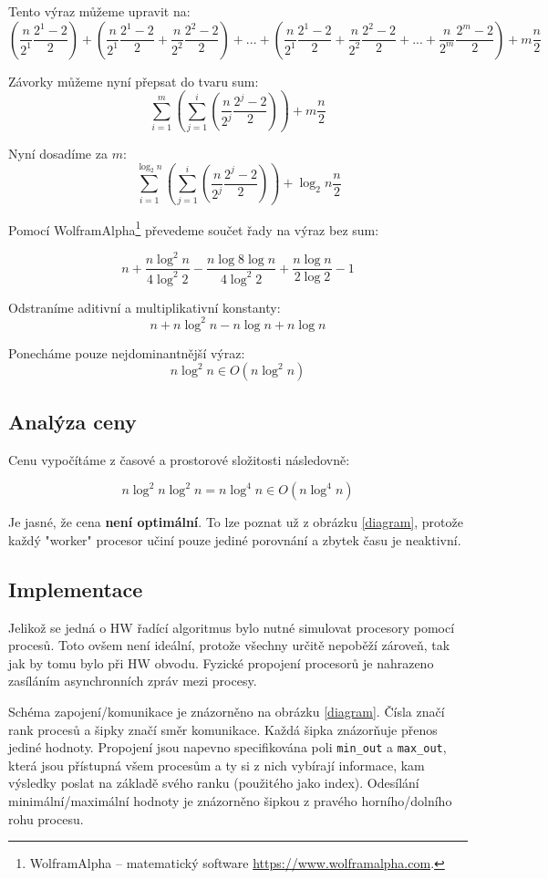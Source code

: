 \documentclass[12pt]{article}
\begin{document}
Tento výraz můžeme upravit na:
\[(\frac{n}{2^1}\frac{2^1 - 2}{2}) + 
  (\frac{n}{2^1}\frac{2^1 - 2}{2} + \frac{n}{2^2}\frac{2^2 - 2}{2}) +
   ... + 
  (\frac{n}{2^1}\frac{2^1 - 2}{2} + \frac{n}{2^2}\frac{2^2 - 2}{2} + ... + \frac{n}{2^m}\frac{2^m - 2}{2}) + m\frac{n}{2}\]

Závorky můžeme nyní přepsat do tvaru sum:
\[\sum\limits_{i=1}^m (\sum\limits_{j=1}^i (\frac{n}{2^j}\frac{2^j-2}{2}))+ m\frac{n}{2}\]

Nyní dosadíme za \(m\):
\[\sum\limits_{i=1}^{\log_2 n} (\sum\limits_{j=1}^i (\frac{n}{2^j}\frac{2^j-2}{2}))+ \log_2 n\frac{n}{2}\]

Pomocí WolframAlpha\footnote{WolframAlpha -- matematický software \href{https://www.wolframalpha.com}{https://www.wolframalpha.com}.} převedeme součet řady na výraz bez sum:

\[n + \frac{n \log^2 n}{4 \log^2 2} - \frac{n \log 8 \log n}{4 \log^2 2} + \frac{n \log n}{2 \log 2} - 1\]

Odstraníme aditivní a multiplikativní konstanty:
\[n + n \log^2 n - n\log n + n \log n\]

Ponecháme pouze nejdominantnější výraz:
\[n \log^2 n \in O(n \log^2 n) \] 

\subsection{Analýza ceny}
Cenu vypočítáme z časové a prostorové složitosti následovně:

\[n \log^2 n \log^2 n = n \log^4 n \in O(n \log^4 n)\]

Je jasné, že cena \textbf{není optimální}. To lze poznat už z obrázku \ref{diagram}, protože každý "worker" procesor učiní pouze jediné porovnání a zbytek času je neaktivní.

\subsection{Implementace}
Jelikož se jedná o HW řadící algoritmus bylo nutné simulovat procesory pomocí procesů. Toto ovšem není ideální, protože všechny určitě nepoběží zároveň, tak jak by tomu bylo při HW obvodu. Fyzické propojení procesorů je nahrazeno zasíláním asynchronních zpráv mezi procesy. 

Schéma zapojení/komunikace je znázorněno na obrázku \ref{diagram}. Čísla značí rank procesů a šipky značí směr komunikace. Každá šipka znázorňuje přenos jediné hodnoty. Propojení jsou napevno specifikována poli \texttt{min\_out} a \texttt{max\_out}, která jsou přístupná všem procesům a ty si z nich vybírají informace, kam výsledky poslat na základě svého ranku (použitého jako index). Odesílání minimální/maximální hodnoty je znázorněno šipkou z pravého horního/dolního rohu procesu.
\end{document}
